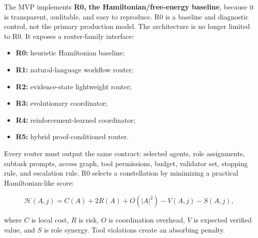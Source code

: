 \documentclass[11pt]{article}
\providecommand{\tightlist}{\setlength{\itemsep}{0pt}\setlength{\parskip}{0pt}}
\begin{document}
The MVP implements \textbf{R0, the Hamiltonian/free-energy baseline},
because it is transparent, auditable, and easy to reproduce. R0 is a baseline and diagnostic control, not the primary production model. The
architecture is no longer limited to R0. It exposes a router-family
interface:

\begin{itemize}
\tightlist
\item \textbf{R0:} heuristic Hamiltonian baseline;
\item \textbf{R1:} natural-language workflow router;
\item \textbf{R2:} evidence-state lightweight router;
\item \textbf{R3:} evolutionary coordinator;
\item \textbf{R4:} reinforcement-learned coordinator;
\item \textbf{R5:} hybrid proof-conditioned router.
\end{itemize}

Every router must output the same contract: selected agents, role
assignments, subtask prompts, access graph, tool permissions, budget,
validator set, stopping rule, and escalation rule. R0 selects a
constellation by minimizing a practical Hamiltonian-like score:

\[
\mathcal{H}(A,j)
=
C(A)+2R(A)+O(|A|^2)-V(A,j)-S(A,j),
\]

where \(C\) is local cost, \(R\) is risk, \(O\) is coordination
overhead, \(V\) is expected verified value, and \(S\) is role synergy.
Tool violations create an absorbing penalty.
\end{document}
